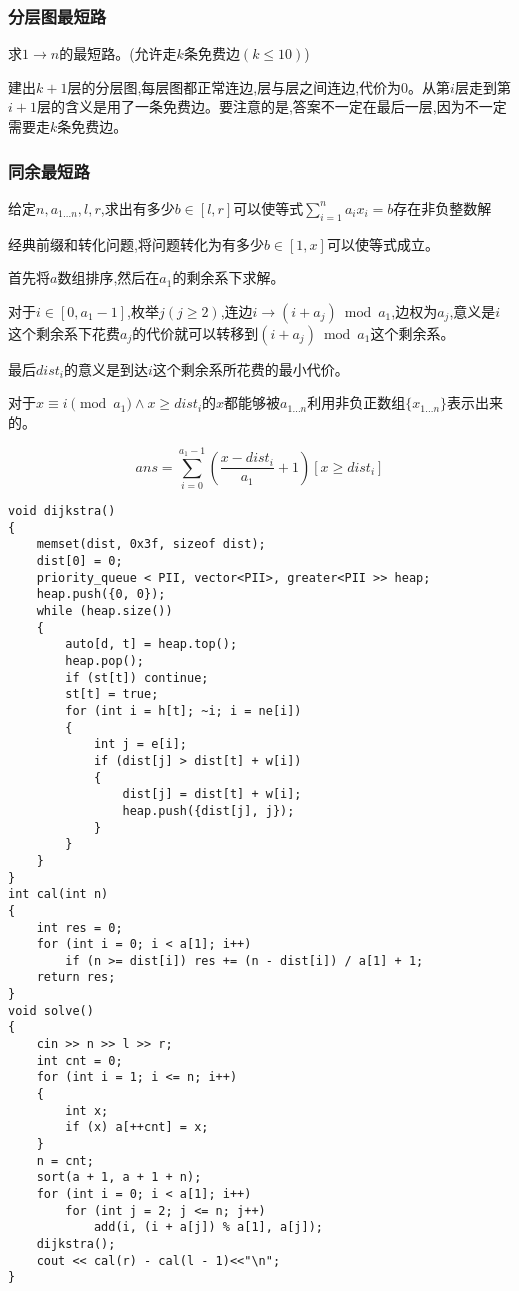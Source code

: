 \documentclass[a4paper, fontset=none]{ctexart}
\begin{document}
\subsubsection{分层图最短路}

求$1\rightarrow n$的最短路。(允许走$k$条免费边$(k\leqslant 10)$)

建出$k+1$层的分层图,每层图都正常连边,层与层之间连边,代价为0。从第$i$层走到第$i+1$层的含义是用了一条免费边。要注意的是,答案不一定在最后一层,因为不一定需要走$k$条免费边。
\subsubsection{同余最短路}

给定$n, a_{1\ldots n}, l, r$,求出有多少$b\in [l, r]$可以使等式$\sum\limits_{i=1}^n{a_ix_i}=b$存在非负整数解

经典前缀和转化问题,将问题转化为有多少$b\in [1, x]$可以使等式成立。

首先将$a$数组排序,然后在$a_1$的剩余系下求解。

对于$i\in [0, a_1-1]$,枚举$j(j\ge 2)$,连边$i\rightarrow (i+a_j)\bmod a_1$,边权为$a_j$,意义是$i$这个剩余系下花费$a_j$的代价就可以转移到$(i+a_j)\bmod a_1$这个剩余系。

最后$dist_i$的意义是到达$i$这个剩余系所花费的最小代价。

对于$x\equiv i\pmod{a_1}\wedge x\ge dist_i$的$x$都能够被$a_{1\ldots n}$利用非负正数组$\{x_{1\ldots n}\}$表示出来的。

\[ans=\sum\limits_{i=0}^{a_1-1}{(\frac{x-dist_i}{a_1}+1)[x\geqslant dist_i]}\]


\begin{verbatim}
void dijkstra()
{
    memset(dist, 0x3f, sizeof dist);
    dist[0] = 0;
    priority_queue < PII, vector<PII>, greater<PII >> heap;
    heap.push({0, 0});
    while (heap.size())
    {
        auto[d, t] = heap.top();
        heap.pop();
        if (st[t]) continue;
        st[t] = true;
        for (int i = h[t]; ~i; i = ne[i])
        {
            int j = e[i];
            if (dist[j] > dist[t] + w[i])
            {
                dist[j] = dist[t] + w[i];
                heap.push({dist[j], j});
            }
        }
    }
}
int cal(int n)
{
    int res = 0;
    for (int i = 0; i < a[1]; i++)
        if (n >= dist[i]) res += (n - dist[i]) / a[1] + 1;
    return res;
}
void solve()
{
    cin >> n >> l >> r;
    int cnt = 0;
    for (int i = 1; i <= n; i++)
    {
        int x;
        if (x) a[++cnt] = x;
    }
    n = cnt;
    sort(a + 1, a + 1 + n);
    for (int i = 0; i < a[1]; i++)
        for (int j = 2; j <= n; j++)
            add(i, (i + a[j]) % a[1], a[j]);
    dijkstra();
    cout << cal(r) - cal(l - 1)<<"\n";
}
\end{verbatim}
\end{document}
